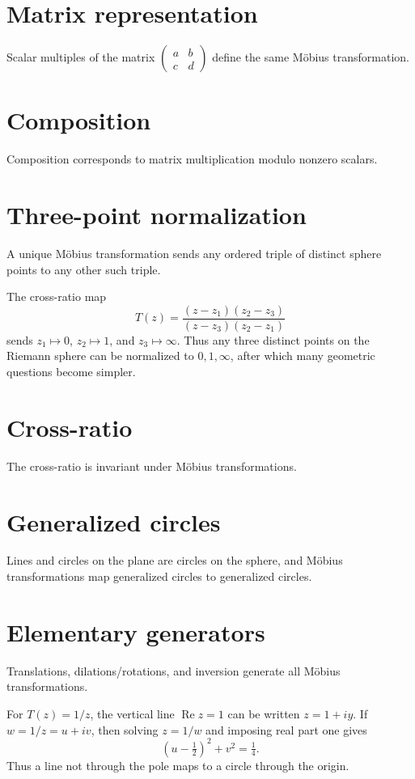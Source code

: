 \section{Matrix representation}
Scalar multiples of the matrix $\begin{pmatrix}a&b\\c&d\end{pmatrix}$ define the same Möbius transformation.

\section{Composition}
Composition corresponds to matrix multiplication modulo nonzero scalars.

\section{Three-point normalization}
A unique Möbius transformation sends any ordered triple of distinct sphere points to any other such triple.

\begin{example}\label{ex:iv16-expand-02}
The cross-ratio map
\[
T(z)=\frac{(z-z_1)(z_2-z_3)}{(z-z_3)(z_2-z_1)}
\]
sends \(z_1\mapsto0\), \(z_2\mapsto1\), and \(z_3\mapsto\infty\). Thus any three distinct points on the Riemann sphere can be normalized to \(0,1,\infty\), after which many geometric questions become simpler.
\end{example}
\section{Cross-ratio}
The cross-ratio is invariant under Möbius transformations.

\section{Generalized circles}
Lines and circles on the plane are circles on the sphere, and Möbius transformations map generalized circles to generalized circles.

\section{Elementary generators}
Translations, dilations/rotations, and inversion generate all Möbius transformations.

\begin{example}\label{ex:iv16-expand-03}
For \(T(z)=1/z\), the vertical line \(\operatorname{Re}z=1\) can be written \(z=1+iy\). If \(w=1/z=u+iv\), then solving \(z=1/w\) and imposing real part one gives
\[
\left(u-\tfrac12\right)^2+v^2=\tfrac14.
\]
Thus a line not through the pole maps to a circle through the origin.
\end{example}
